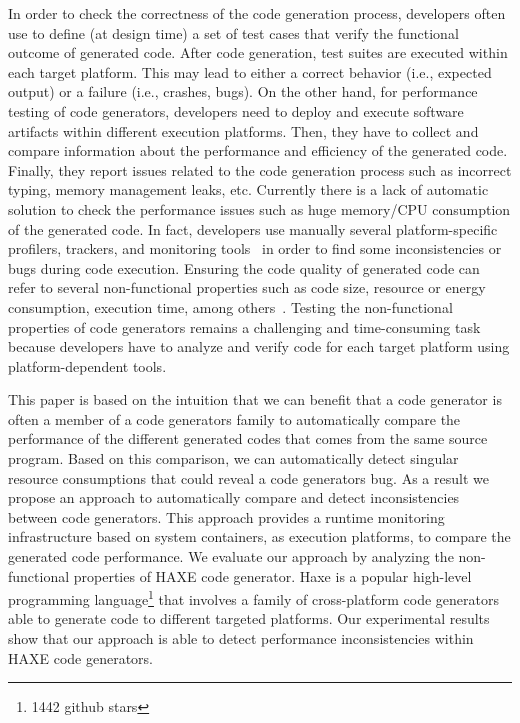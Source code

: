 In order to check the correctness of the code generation process, developers often use to define (at design time) a set of test cases that verify the functional outcome of generated code. After code generation, test suites are executed within each target platform. This may lead to either a correct behavior (i.e., expected output) or a failure (i.e., crashes, bugs). On the other hand, for performance testing of code generators, developers need to deploy and execute software artifacts within different execution platforms. Then, they have to collect and compare information about the performance and efficiency of the generated code. Finally, they report issues related to the code generation process such as incorrect typing, memory management leaks, etc. Currently there is a lack of automatic solution to check the performance issues such as huge memory/CPU consumption of the generated code. In fact, developers use manually several platform-specific profilers, trackers, and monitoring tools~\cite{guana2014chaintracker,delgado2004taxonomy} in order to find some inconsistencies or bugs during code execution. Ensuring the code quality of generated code can refer to several non-functional properties such as code size, resource or energy consumption, execution time, among others~\cite{pan2006fast}. %
Testing the non-functional properties of code generators remains a challenging and time-consuming task because developers have to analyze and verify code for each target platform using platform-dependent tools.

This paper is based on the intuition that we can benefit that a code generator is often a member of a code generators family to automatically compare the  performance of the different generated codes that comes from the same source program. Based on this comparison, we can automatically detect singular resource consumptions that could reveal a code generators bug. As a result we propose an approach to automatically compare and detect inconsistencies between code generators. This approach provides a runtime monitoring infrastructure based on system containers, as execution platforms, to compare the generated code performance. %
We evaluate our approach by analyzing the non-functional properties of HAXE code generator. Haxe is a popular high-level programming language\footnote{1442 github stars} that involves a family of cross-platform code generators able to generate code to different targeted platforms. Our experimental results show that our approach is able to detect performance inconsistencies within HAXE code generators.


